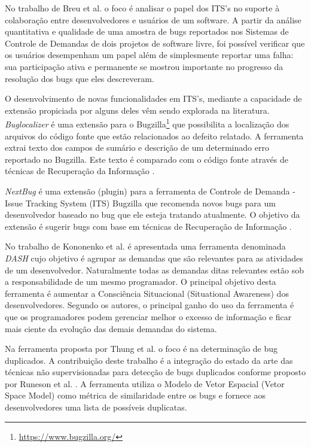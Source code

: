 \documentclass[msc,proposal,hidelot,hideabstract]{ppgccufmg} %
\begin{document}
No trabalho de Breu et al.\cite{Breu:2010:INB:1718918.1718973} o foco é
analisar o papel dos ITS's no suporte à colaboração entre desenvolvedores e
usuários de um software. A partir da análise quantitativa e qualidade de uma
amostra de bugs reportados nos Sistemas de Controle de Demandas de dois
projetos de software livre, foi possível verificar que os usuários desempenham
um papel além de simplesmente reportar uma falha: sua participação ativa e
permanente se mostrou importante no progresso da resolução dos bugs que eles
descreveram.

O desenvolvimento de novas funcionalidades em ITS's, mediante a capacidade de
extensão propiciada por alguns deles vêm sendo explorada na literatura. \textit{Buglocalizer} \cite{Thung:2014:BIT:2635868.2661678} é uma extensão para o Bugzilla\footnote{\url{https://www.bugzilla.org/}} que possibilita a
localização dos arquivos do código fonte que estão relacionados ao defeito
relatado. A ferramenta extrai texto dos campos de sumário e descrição de um
determinado erro reportado no Bugzilla. Este texto é comparado com o código
fonte através de técnicas de Recuperação da Informação \cite{baeza1999modern}.

\textit{NextBug} \cite{101186} é uma extensão (plugin) para a ferramenta de Controle de Demanda -
Issue Tracking System (ITS) Bugzilla que recomenda novos bugs para um desenvolvedor baseado no bug que ele esteja
tratando atualmente. O objetivo da extensão é sugerir bugs com base em técnicas de
Recuperação de Informação \cite{baeza1999modern}.

No trabalho de Kononenko et al. \cite{Kononenko:2014:DED:2591062.2591075} é
apresentada uma ferramenta denominada \textit{DASH} cujo objetivo é agrupar as
demandas que são relevantes para as atividades de um desenvolvedor. Naturalmente todas as demandas ditas relevantes estão sob a
responsabilidade de um mesmo programador. O principal objetivo desta
ferramenta é aumentar a Consciência Situacional (Situational Awareness) dos
desenvolvedores. Segundo os autores, o principal ganho do uso da ferramenta é
que os programadores podem gerenciar melhor o excesso de informação e ficar
mais ciente da evolução das demais demandas do sistema.

Na ferramenta proposta por Thung et al. \cite{Thung:2014:DIT:2642937.2648627} o
foco é na determinação de bug duplicados. A contribuição deste trabalho é a
integração do estado da arte das técnicas não supervisionadas para detecção de
bugs duplicados conforme proposto por Runeson et al. \cite{Runeson:2007:DDD:1248820.1248882}. A ferramenta utiliza o Modelo de
Vetor Espacial (Vetor Space Model) como métrica de similaridade entre os bugs e
fornece aos desenvolvedores uma lista de possíveis duplicatas.
\end{document}

